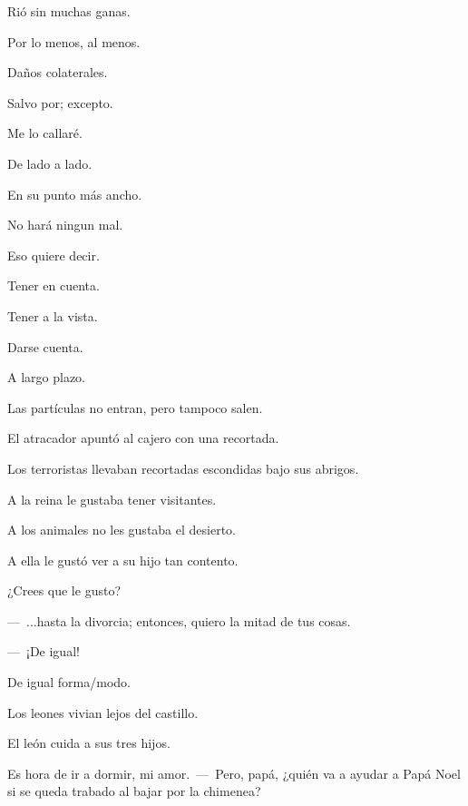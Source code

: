 \sk
Rió sin muchas ganas.

\sk
Por lo menos, al menos. 

\sk
Daños colaterales. 

\sk
Salvo por; excepto. 

\sk
Me lo callaré. 

\sk
De lado a lado.

\sk
En su punto más ancho. 

\sk
No hará ningun mal. 


\sk
Eso quiere decir. 

\sk
Tener en cuenta. 

\sk
Tener a la vista. 

\sk
Darse cuenta. 

\sk
A largo plazo. 

\sk
Las partículas no entran, pero tampoco salen. 

\sk
El atracador apuntó al cajero con una recortada. 

\sk
Los terroristas llevaban recortadas escondidas bajo sus abrigos. 

\sk
A la reina le gustaba tener visitantes.

\sk
A los animales no les gustaba el desierto. 

\sk
A ella le gustó ver a su hijo tan contento. 

\sk
¿Crees que le gusto? 

\sk
---~...hasta la divorcia; entonces, quiero la mitad de tus cosas.

---~¡De igual! 

\sk
De igual forma/modo. 

\sk
Los leones vivian lejos del castillo.

\sk
El león cuida a sus tres hijos.

\sk
Es hora de ir a dormir, mi amor.~---~Pero, papá, ¿quién va a ayudar a Papá Noel si se queda trabado al bajar por la chimenea? 

